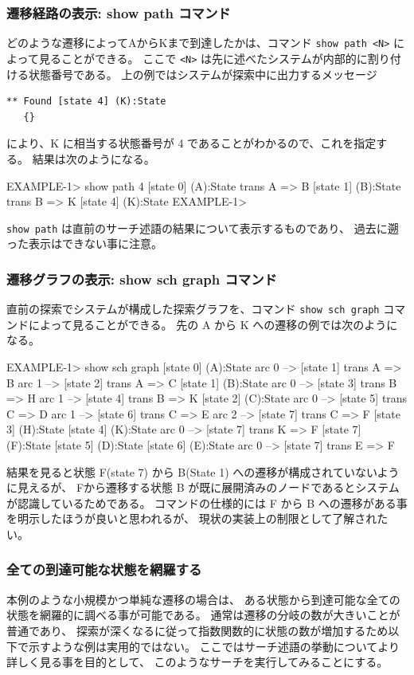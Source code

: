 \documentclass{article}
\begin{document}
\subsubsection{遷移経路の表示: show path コマンド}
\label{sec:show-path}
どのような遷移によってAからKまで到達したかは、コマンド \texttt{show path <N>} によって見ることができる。
ここで \texttt{<N>} は先に述べたシステムが内部的に割り付ける状態番号である。
上の例ではシステムが探索中に出力するメッセージ 
\begin{verbatim}
** Found [state 4] (K):State
   {}
\end{verbatim}
により、K に相当する状態番号が 4 であることがわかるので、これを指定する。
結果は次のようになる。
\begin{simplev}
EXAMPLE-1> show path 4
[state 0] (A):State
  trans A => B
[state 1] (B):State
  trans B => K
[state 4] (K):State
EXAMPLE-1> 
\end{simplev}
\texttt{show path} は直前のサーチ述語の結果について表示するものであり、
過去に遡った表示はできない事に注意。

\subsubsection{遷移グラフの表示: show sch graph コマンド}
\label{sec:show-sch-graph}
直前の探索でシステムが構成した探索グラフを、コマンド \texttt{show sch graph} コマンドによって見ることができる。
先の A から K への遷移の例では次のようになる。
\begin{simplev}
EXAMPLE-1> show sch graph
[state 0] (A):State
  arc 0 --> [state 1] 
    trans A => B
  arc 1 --> [state 2] 
    trans A => C
[state 1] (B):State
  arc 0 --> [state 3] 
    trans B => H
  arc 1 --> [state 4] 
    trans B => K
[state 2] (C):State
  arc 0 --> [state 5] 
    trans C => D
  arc 1 --> [state 6] 
    trans C => E
  arc 2 --> [state 7] 
    trans C => F
[state 3] (H):State
[state 4] (K):State
  arc 0 --> [state 7] 
    trans K => F
[state 7] (F):State
[state 5] (D):State
[state 6] (E):State
  arc 0 --> [state 7] 
    trans E => F
\end{simplev}
結果を見ると状態 F(state 7) から B(State 1) への遷移が構成されていないように見えるが、
Fから遷移する状態 B が既に展開済みのノードであるとシステムが認識しているためである。
コマンドの仕様的には F から B への遷移がある事を明示したほうが良いと思われるが、
現状の実装上の制限として了解されたい。

\subsubsection{全ての到達可能な状態を網羅する}
本例のような小規模かつ単純な遷移の場合は、
ある状態から到達可能な全ての状態を網羅的に調べる事が可能である。
通常は遷移の分岐の数が大きいことが普通であり、
探索が深くなるに従って指数関数的に状態の数が増加するため以下で示すような例は実用的ではない。
ここではサーチ述語の挙動についてより詳しく見る事を目的として、
このようなサーチを実行してみることにする。
\end{document}

